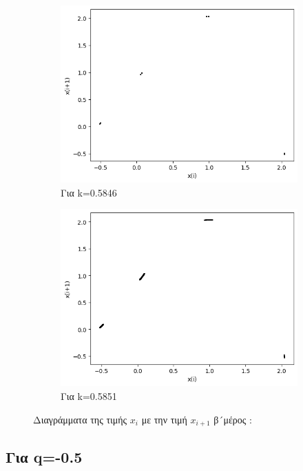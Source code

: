 \begin{figure}[h!]
\begin{subfigure}[b]{0.4\textwidth}
		\includegraphics[width=\textwidth]{LateX images/graphs q03/g13}
		\caption{Για k=0.5846}
		\label{f:k25}
	\end{subfigure}
	\hfill
	\begin{subfigure}[b]{0.4\textwidth}
		\centering
		\includegraphics[width=\textwidth]{LateX images/graphs q03/g14}
		\caption{Για k=0.5851}
		\label{f:k26}
	\end{subfigure}
\caption{Διαγράμματα της τιμής \(x_i\) με την τιμή \(x_{i+1}\) β´μέρος :}	
\end{figure}

\clearpage

\subsection{Για q=-0.5}

